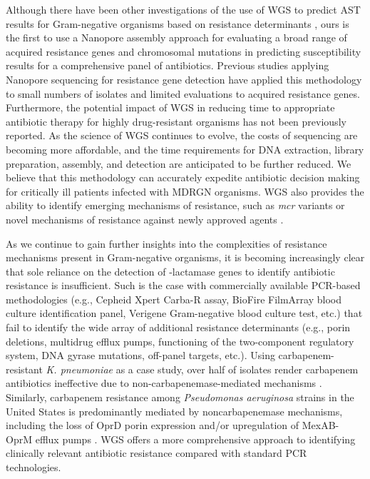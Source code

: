 Although there have been other investigations of the use of WGS to predict AST results for Gram-negative organisms based on resistance determinants \citep{Shelburne2017-dm, Cao2016-oj, Schmidt2017-ng, Lemon2017-td, Judge2015-zw, Judge2016-ds, Li2019-op, Van_der_Helm2017-ww, Xia2017-ss, Stoesser2013-se}, ours is the first to use a Nanopore assembly approach for evaluating a broad range of acquired resistance genes and chromosomal mutations in predicting susceptibility results for a comprehensive panel of antibiotics. Previous studies applying Nanopore sequencing for resistance gene detection have applied this methodology to small numbers of isolates and limited evaluations to acquired resistance genes. Furthermore, the potential impact of WGS in reducing time to appropriate antibiotic therapy for highly drug-resistant organisms has not been previously reported. As the science of WGS continues to evolve, the costs of sequencing are becoming more affordable, and the time requirements for DNA extraction, library preparation, assembly, and detection are anticipated to be further reduced. We believe that this methodology can accurately expedite antibiotic decision making for critically ill patients infected with MDRGN organisms. WGS also provides the ability to identify emerging mechanisms of resistance, such as \textit{mcr} variants or novel mechanisms of resistance against newly approved agents \citep{Haidar2017-pk, Haidar2017-rw}.

As we continue to gain further insights into the complexities of resistance mechanisms present in Gram-negative organisms, it is becoming increasingly clear that sole reliance on the detection of {\textbeta}-lactamase genes to identify antibiotic resistance is insufficient. Such is the case with commercially available PCR-based methodologies (e.g., Cepheid Xpert Carba-R assay, BioFire FilmArray blood culture identification panel, Verigene Gram-negative blood culture test, etc.) that fail to identify the wide array of additional resistance determinants (e.g., porin deletions, multidrug efflux pumps, functioning of the two-component regulatory system, DNA gyrase mutations, off-panel targets, etc.). Using carbapenem-resistant \textit{K. pneumoniae} as a case study, over half of isolates render carbapenem antibiotics ineffective due to non-carbapenemase-mediated mechanisms \citep{Tamma2017-el}. Similarly, carbapenem resistance among \textit{Pseudomonas aeruginosa} strains in the United States is predominantly mediated by noncarbapenemase mechanisms, including the loss of OprD porin expression and/or upregulation of MexAB-OprM efflux pumps \citep{Lister2009-ex}. WGS offers a more comprehensive approach to identifying clinically relevant antibiotic resistance compared with standard PCR technologies.

